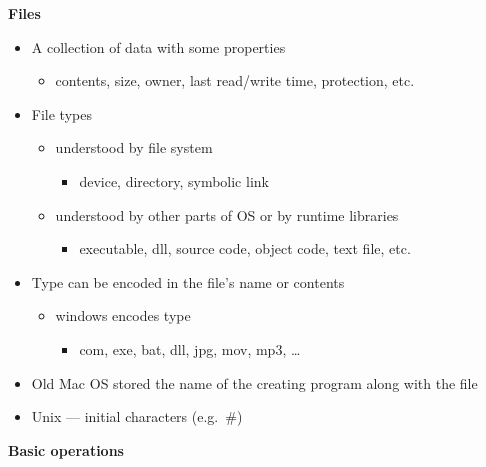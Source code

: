 \documentclass[11pt,a4paper]{article}
\begin{document}
\textbf{Files}
\begin{itemize}
    \item A collection of data with some properties
        \begin{itemize}
            \item contents, size, owner, last read/write time, protection, etc.
        \end{itemize}
    \item File types
        \begin{itemize}
            \item understood by file system
                \begin{itemize}
                    \item device, directory, symbolic link
                \end{itemize}
            \item understood by other parts of OS or by runtime libraries
                \begin{itemize}
                    \item executable, dll, source code, object code, text file, etc.
                \end{itemize}
        \end{itemize}
    \item Type can be encoded in the file's name or contents
        \begin{itemize}
            \item windows encodes type
                \begin{itemize}
                    \item com, exe, bat, dll, jpg, mov, mp3, \dots
                \end{itemize}
        \end{itemize}
    \item Old Mac OS stored the name of the creating program along with the file
    \item Unix --- initial characters (e.g.\ #)
\end{itemize}

\textbf{Basic operations}
\end{document}
